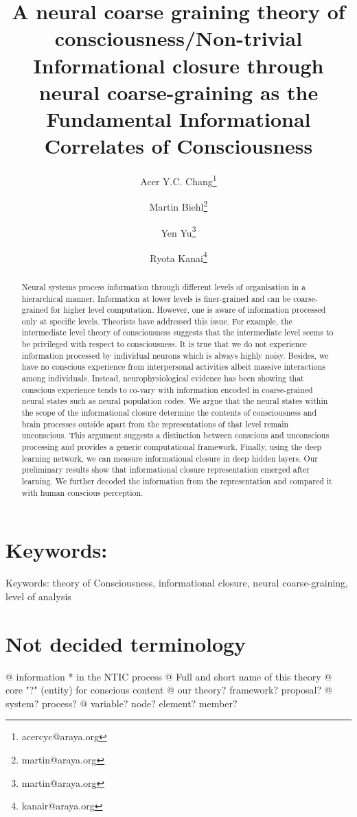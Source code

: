 \documentclass[utf8]{article}
\title{A neural coarse graining theory of consciousness/\newline Non-trivial Informational closure through neural coarse-graining as the Fundamental Informational Correlates of Consciousness }
\author[1]{Acer Y.C. Chang\thanks{acercyc@araya.org}}
\author[1]{Martin Biehl\thanks{martin@araya.org}}
\author[1]{Yen Yu\thanks{martin@araya.org}}
\author[1]{Ryota Kanai\thanks{kanair@araya.org }}
\affil[1]{ARAYA, Inc., Tokyo, Japan}
\newenvironment{ants}
			{
			 \begin{easylist}[itemize]
		 	}
			{
			\end{easylist}
			} %
\begin{document}
	\maketitle
	\tableofcontents


	\begin{abstract}
		Neural systems process information through different levels of organisation in a hierarchical manner. Information at lower levels is finer-grained and can be coarse-grained for higher level computation. However, one is aware of information processed only at specific levels. Theorists have addressed this issue. For example, the intermediate level theory of consciousness suggests that the intermediate level seems to be privileged with respect to consciousness. It is true that we do not experience information processed by individual neurons which is always highly noisy. Besides, we have no conscious experience from interpersonal activities albeit massive interactions among individuals. Instead, neurophysiological evidence has been showing that conscious experience tends to co-vary with information encoded in coarse-grained neural states such as neural population codes. We argue that the neural states within the scope of the informational closure determine the contents of consciousness and brain processes outside apart from the representations of that level remain unconscious. This argument suggests a distinction between conscious and unconscious processing and provides a generic computational framework. Finally, using the deep learning network, we can measure informational closure in deep hidden layers. Our preliminary results show that informational closure representation emerged after learning. We further decoded the information from the representation and compared it with human conscious perception.
	\end{abstract}


	\section*{Keywords:}
	Keywords: theory of Consciousness, informational closure, neural coarse-graining, level of analysis

    \newpage
    \section*{Not decided terminology}
        \begin{ants}
            @ information * in the NTIC process
            @ Full and short name of this theory
            @ core "?" (entity) for conscious content 
            @ our theory? framework? proposal? 
            @ system? process?
            @ variable? node? element? member?
        \end{ants}
    
\end{document}
